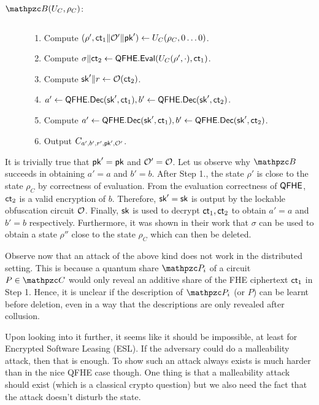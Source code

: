 \begin{description}
\item[\underline{$\qB(U_C, \rho_C)$}:] $ $
\begin{enumerate}
\item Compute $(\rho', \mathsf{ct}_1 \| \mathcal{O}'\| \mathsf{pk}') \leftarrow U_C(\rho_C,
0\ldots0)$.
\item Compute $\sigma \| \mathsf{ct}_2 \leftarrow \mathsf{QFHE}.\mathsf{Eval}(U_C(\rho', \cdot),
\mathsf{ct}_1)$.
\item Compute $\mathsf{sk}' \| r \leftarrow \mathcal{O}(\mathsf{ct}_2)$.
\item $a' \leftarrow \mathsf{QFHE}.\mathsf{Dec}(\mathsf{sk}', \mathsf{ct}_1), b' \leftarrow \mathsf{QFHE}.\mathsf{Dec}(\mathsf{sk}',
\mathsf{ct}_2)$.
\item Compute $a' \leftarrow \mathsf{QFHE}.\mathsf{Dec}(\mathsf{sk}', \mathsf{ct}_1), b' \leftarrow
\mathsf{QFHE}.\mathsf{Dec}(\mathsf{sk}', \mathsf{ct}_2)$.
\item Output $C_{a', b', r', \mathsf{pk}', \mathcal{O}'}$.
\end{enumerate}
\end{description}

It is trivially true that $\mathsf{pk}' = \mathsf{pk}$ and $\mathcal{O}' = \mathcal{O}$. Let us
observe why $\qB$ succeeds in obtaining $a' = a$ and $b' = b$. After
Step 1., the state $\rho'$ is close to the state $\rho_C$ by
correctness of evaluation. From the evaluation correctness of
$\mathsf{QFHE}$, $\mathsf{ct}_2$ is a valid encryption of $b$. Therefore, $\mathsf{sk}' =
\mathsf{sk}$ is output by the lockable obfuscation circuit $\mathcal{O}$. Finally,
$\mathsf{sk}$ is used to decrypt $\mathsf{ct}_1, \mathsf{ct}_2$ to obtain $a' = a$ and
$b'=b$ respectively. Furthermore, it was shown in their work that
$\sigma$ can be used to obtain a state $\rho''$ close to the state
$\rho_C$ which can then be deleted.

Observe now that an attack of the above kind does not work in the
distributed setting. This is because a quantum share $\qP_i$ of a
circuit $P \in \qC$ would only reveal an additive share of the FHE
ciphertext $\mathsf{ct}_1$ in Step 1. Hence, it is unclear if the
description of $\qP_i$ (or $P$) can be learnt before deletion, even
in a way that the descriptions are only revealed after collusion.

Upon looking into it further, it seems like it should be impossible,
at least for Encrypted Software Leasing (ESL). If the adversary could
do a malleability attack, then that is enough. To show such an attack
always exists is much harder than in the nice QFHE case though. One thing is
that a malleability attack should exist (which is a classical crypto
question) but we also need the fact that the attack doesn't disturb
the state.

\begin{comment}
\begin{remark}[Necessity of Secrecy]
Do we need secrecy in the first stage to beat SSL impossibility?
\end{remark}
\end{comment}

